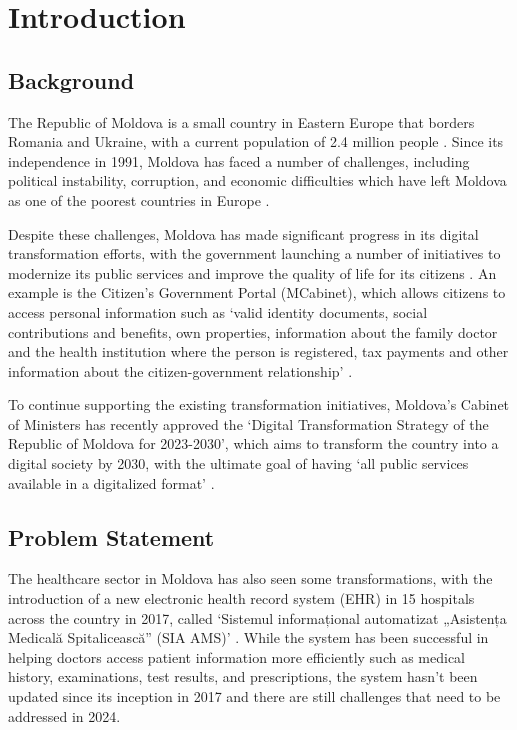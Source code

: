 \chapter{Introduction}
\label{chap:introduction}

\section{Background}

The Republic of Moldova is a small country in Eastern Europe that borders Romania and Ukraine, with a current population of 2.4 million people \parencite{mdpop}. Since its independence in 1991, Moldova has faced a number of challenges, including political instability, corruption, and economic difficulties which have left Moldova as one of the poorest countries in Europe \parencite{mdpoverty}. 

Despite these challenges, Moldova has made significant progress in its digital transformation efforts, with the government launching a number of initiatives to modernize its public services and improve the quality of life for its citizens \parencite{mdega}. An example is the Citizen's Government Portal (MCabinet), which allows citizens to access personal information such as `valid identity documents, social contributions and benefits, own properties, information about the family doctor and the health institution where the person is registered, tax payments and other information about the citizen-government relationship' \parencite{mdcabinet}. 

To continue supporting the existing transformation initiatives, Moldova's Cabinet of Ministers has recently approved the `Digital Transformation Strategy of the Republic of Moldova for 2023-2030', which aims to transform the country into a digital society by 2030, with the ultimate goal of having `all public services available in a digitalized format' \parencite{mdstrategy}.

\section{Problem Statement}

The healthcare sector in Moldova has also seen some transformations, with the introduction of a new electronic health record system (EHR) in 15 hospitals across the country in 2017, called `Sistemul informațional automatizat „Asistența Medicală Spitalicească” (SIA AMS)' \parencite{mdehr}. While the system has been successful in helping doctors access patient information more efficiently such as medical history, examinations, test results, and prescriptions, the system hasn't been updated since its inception in 2017 and there are still challenges that need to be addressed in 2024.

